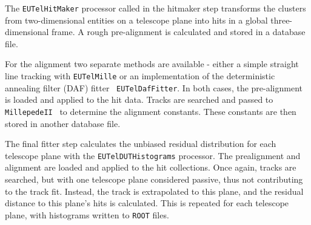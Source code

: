 The \texttt{EUTelHitMaker} processor called in the hitmaker step transforms the
clusters from two-dimensional entities on a telescope plane into hits in a
global three-dimensional frame. A rough pre-alignment is calculated and stored
in a database file.

For the alignment two separate methods are available - either a simple straight
line tracking with \texttt{EUTelMille} or an implementation of the deterministic
annealing filter (DAF) fitter~\cite{ref:daffitter} \texttt{EUTelDafFitter}. In
both cases, the pre-alignment is loaded and applied to the hit data. Tracks are
searched and passed to \texttt{MillepedeII}~\cite{ref:millepede} to determine
the alignment constants. These constants are then stored in another database
file.

The final fitter step calculates the unbiased residual distribution for each
telescope plane with the \texttt{EUTelDUTHistograms} processor. The prealignment
and alignment are loaded and applied to the hit collections. Once again, tracks
are searched, but with one telescope plane considered passive, thus not
contributing to the track fit. Instead, the track is extrapolated to this plane,
and the residual distance to this plane's hits is calculated. This is repeated
for each telescope plane, with histograms written to \texttt{ROOT} files.


